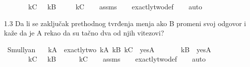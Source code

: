 \begin{isabellebody}
\begin{exercise}[subtitle=Raymond M. Smullyan: Logical Labyrinths]
\ \ \ \ \ \ \ {\isachardoublequoteopen}kC\ {\isasymlongleftrightarrow}\ {\isasymnot}\ kB{\isachardoublequoteclose}\isanewline
\ \ \ \ \ {\isachardoublequoteopen}kC{\isachardoublequoteclose}\isanewline
%
\isadelimproof
\ \ %
\endisadelimproof
%
\isatagproof
{}\isamarkupfalse%
\ assms\isanewline
\ \ \isamarkupfalse%
\ exactly{\isacharunderscore}{\kern0pt}two{\isacharunderscore}{\kern0pt}def\isanewline
\ \ \isamarkupfalse%
\ auto%
\endisatagproof
{\isafoldproof}%
%
\isadelimproof
%
\endisadelimproof
%
\begin{isamarkuptext}%
1.3 Da li se zaključak prethodnog tvrđenja menja ako B promeni svoj odgovor 
          i kaže da je A rekao da su tačno dva od njih vitezovi?%
\end{isamarkuptext}\isamarkuptrue%
\isamarkupfalse%
\ Smullyan{\isacharunderscore}{\kern0pt}{}{\isacharunderscore}{\kern0pt}{}{\isacharcolon}{\kern0pt}\isanewline
\ \ \ {\isachardoublequoteopen}kA\ {\isasymlongleftrightarrow}\ {\isacharparenleft}{\kern0pt}exactly{\isacharunderscore}{\kern0pt}two\ kA\ kB\ kC\ {\isasymlongleftrightarrow}\ yesA{\isacharparenright}{\kern0pt}{\isachardoublequoteclose}\isanewline
\ \ \ \ \ \ \ {\isachardoublequoteopen}kB\ {\isasymlongleftrightarrow}\ yesA{\isachardoublequoteclose}\isanewline
\ \ \ \ \ \ \ {\isachardoublequoteopen}kC\ {\isasymlongleftrightarrow}\ {\isasymnot}\ kB{\isachardoublequoteclose}\isanewline
\ \ \ \ \ {\isachardoublequoteopen}{\isasymnot}\ kC{\isachardoublequoteclose}\isanewline
%
\isadelimproof
\ \ %
\endisadelimproof
%
\isatagproof
{}\isamarkupfalse%
\ assms\isanewline
\ \ \isamarkupfalse%
\ exactly{\isacharunderscore}{\kern0pt}two{\isacharunderscore}{\kern0pt}def\isanewline
\ \ \isamarkupfalse%
\ auto%
\endisatagproof
{\isafoldproof}%
%
\isadelimproof
%
\endisadelimproof
%
\end{exercise}
%
\isadelimtheory
%
\endisadelimtheory
%
\isatagtheory
%
\endisatagtheory
{\isafoldtheory}%
%
\isadelimtheory
%
\endisadelimtheory
%
\end{isabellebody}%
\endinput
